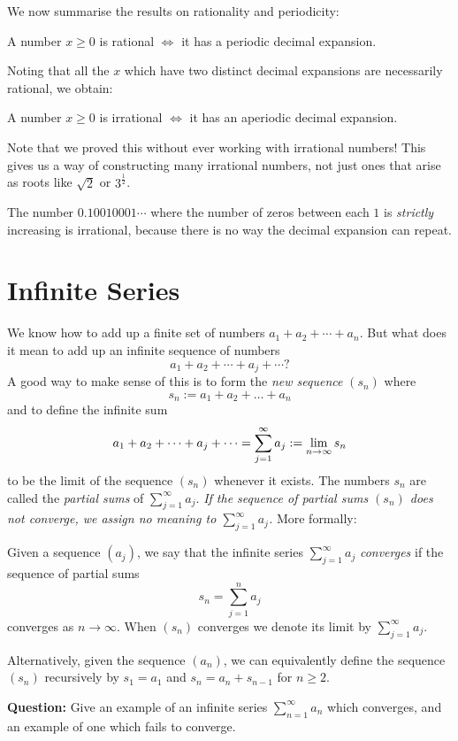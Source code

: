 \documentclass[11pt,dvipsnames]{book}
\numberwithin{equation}{section} %
\numberwithin{figure}{section} %
\numberwithin{table}{section} %
\begin{document}
We now summarise the results on rationality and periodicity:
\begin{theorem}\label{87}
A number $x  \geq 0$ is rational $\iff$ it has a periodic decimal expansion.
\end{theorem}
Noting that all the $x$ which have two distinct decimal expansions are necessarily rational, we obtain:
\begin{corollary}\label{88}
A number $x  \geq 0$ is irrational $\iff$ it has an aperiodic decimal expansion.
\end{corollary}
Note that we proved this without ever working with irrational numbers! This gives us a way of constructing many irrational numbers, not just ones that arise as roots like $\sqrt{2}$ or $3^{\frac{1}{2}}$.

\begin{example}
The number $0.10010001\cdots $ where the number of zeros between each $1$ is {\em strictly} increasing is irrational, because there is no way the decimal expansion can repeat. 
\end{example}

\section{Infinite Series}
We know how to add up a finite set of numbers $a_1 + a_2 + \cdots + a_n$. But what does it mean to add up an infinite sequence of numbers
\[ a_1 + a_2 + \cdots + a_j + \cdots ?\]
A good way to make sense of this is to form the {\em new sequence} $(s_n)$ where
\[ s_n := a_1 + a_2 + \dots + a_n\]
and to define the infinite sum 
$$a_1 + a_2 + \cdots + a_j + \cdots = \sum_{j=1}^\infty a_j := \lim_{n\rightarrow\infty} s_n$$ 
to be the limit of the sequence $(s_n)$ whenever it exists. The numbers $s_n$ are called the {\em partial sums} of $\sum_{j=1}^\infty a_j$. {\em If the sequence of partial sums $(s_n)$ does not converge, we assign no meaning to $\sum_{j=1}^\infty a_j$.} More formally:
\begin{definition}
Given a sequence $(a_{j})$, we say that the infinite series $\sum_{j=1}^\infty a_{j}$ {\it converges} if the sequence of partial sums
\[
s_{n}=\sum_{j=1}^{n}a_{j}
\]
converges as $n\rightarrow\infty$. When $(s_n)$ converges we denote its limit by $\sum_{j=1}^{\infty}a_{j}$. 
\end{definition}
Alternatively, given the sequence $(a_n)$, we can equivalently define the sequence $(s_n)$ recursively by
$s_1 = a_1$ and
$s_{n} = a_n + s_{n-1}$
for $n \geq 2$. 

\medskip
\noindent
{\bf Question:} Give an example of an infinite series $\sum_{n=1}^\infty a_n$ which converges, and an example of one which fails to converge.
\end{document}
